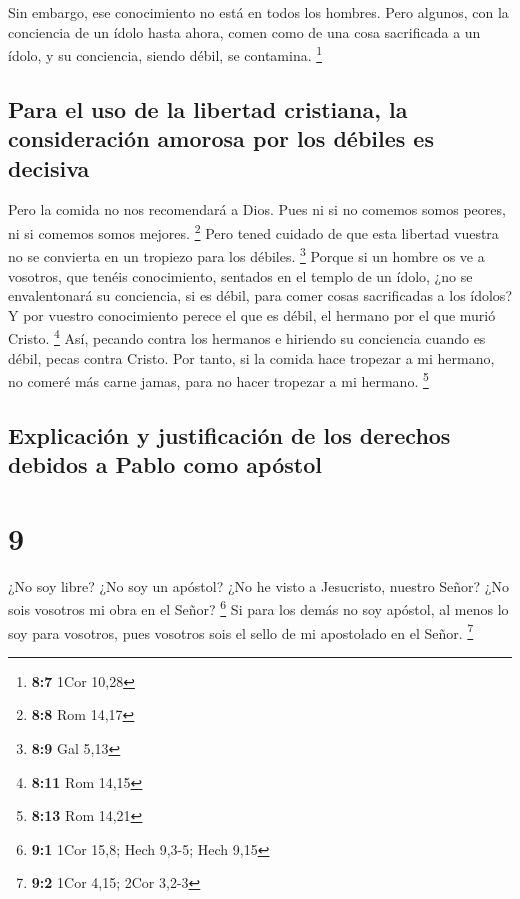  Sin embargo, ese conocimiento no está en todos los
hombres. Pero algunos, con la conciencia de un ídolo hasta ahora, comen
como de una cosa sacrificada a un ídolo, y su conciencia, siendo débil,
se contamina. \footnote{\textbf{8:7} 1Cor 10,28}

\hypertarget{para-el-uso-de-la-libertad-cristiana-la-consideraciuxf3n-amorosa-por-los-duxe9biles-es-decisiva}{%
\subsection{Para el uso de la libertad cristiana, la consideración
amorosa por los débiles es
decisiva}\label{para-el-uso-de-la-libertad-cristiana-la-consideraciuxf3n-amorosa-por-los-duxe9biles-es-decisiva}}

 Pero la comida no nos recomendará a Dios. Pues ni si no
comemos somos peores, ni si comemos somos mejores. \footnote{\textbf{8:8}
  Rom 14,17}  Pero tened cuidado de que esta libertad
vuestra no se convierta en un tropiezo para los débiles. \footnote{\textbf{8:9}
  Gal 5,13}  Porque si un hombre os ve a vosotros, que
tenéis conocimiento, sentados en el templo de un ídolo, ¿no se
envalentonará su conciencia, si es débil, para comer cosas sacrificadas
a los ídolos?  Y por vuestro conocimiento perece el que
es débil, el hermano por el que murió Cristo. \footnote{\textbf{8:11}
  Rom 14,15}  Así, pecando contra los hermanos e hiriendo
su conciencia cuando es débil, pecas contra Cristo.  Por
tanto, si la comida hace tropezar a mi hermano, no comeré más carne
jamas, para no hacer tropezar a mi hermano. \footnote{\textbf{8:13} Rom
  14,21}

\hypertarget{explicaciuxf3n-y-justificaciuxf3n-de-los-derechos-debidos-a-pablo-como-apuxf3stol}{%
\subsection{Explicación y justificación de los derechos debidos a Pablo
como
apóstol}\label{explicaciuxf3n-y-justificaciuxf3n-de-los-derechos-debidos-a-pablo-como-apuxf3stol}}

\hypertarget{section-8}{%
\section{9}\label{section-8}}

 ¿No soy libre? ¿No soy un apóstol? ¿No he visto a
Jesucristo, nuestro Señor? ¿No sois vosotros mi obra en el Señor?
\footnote{\textbf{9:1} 1Cor 15,8; Hech 9,3-5; Hech 9,15} 
Si para los demás no soy apóstol, al menos lo soy para vosotros, pues
vosotros sois el sello de mi apostolado en el Señor. \footnote{\textbf{9:2}
  1Cor 4,15; 2Cor 3,2-3}

